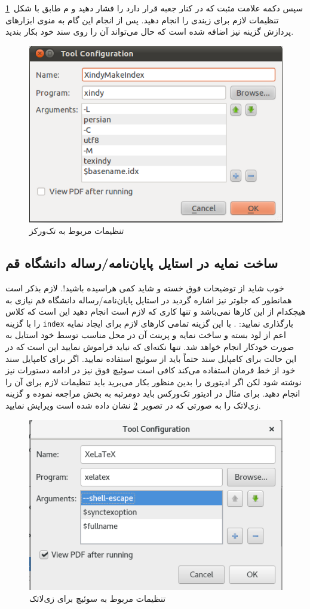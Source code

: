 {{{    سپس دکمه علامت مثبت که در کنار جعبه   قرار دارد را فشار دهید و م
    طابق با شکل~\ref{fig:texworks_xindy}
    تنظیمات لازم برای زیندی را انجام دهید. پس از انجام این گام به منوی ابزارهای پردازش گزینه  نیز اضافه شده است که حال 
    می‌تواند آن را روی سند خود بکار بندید. 
    \begin{figure}[!h]
    \centering
    \centerline{\includegraphics[width=.5\textwidth]{Xindy_Make_Index.png}}
    \caption{تنظیمات مربوط به تک‌ورکز}
    \label{fig:texworks_xindy}
    \end{figure}

    \subsection{ساخت نمایه در استایل پایان‌نامه/رساله دانشگاه قم}
    خوب شاید از توضیحات فوق خسته و شاید کمی هراسیده باشید!. لازم بذکر است 
    همانطور که جلوتر نیز اشاره گردید در استایل پایان‌نامه/رساله دانشگاه قم نیازی به هیچکدام از این کارها نمی‌باشد و تنها کاری که لازم است انجام دهید این است 
    که کلاس را با گزینه     \Verb+index+     بارگذاری نمایید:
     .
     با این گزینه تمامی کارهای لازم برای ایجاد نمایه اعم از لود بسته و ساخت نمایه و پرینت آن در محل مناسب توسط خود استایل به صورت خودکار انجام خواهد شد. 
     تنها نکته‌ای که نباید فراموش نمایید این است که در این حالت برای کامپایل سند حتماً باید از سوئیچ  استفاده نمایید. 
     اگر برای کامپایل سند خود از خط فرمان استفاده می‌کند کافی است سوئیچ فوق نیز در ادامه دستورات نیز نوشته شود لکن اگر ادیتوری را بدین منظور 
     بکار می‌برید باید تنظیمات لازم برای آن را انجام دهید. برای مثال در ادیتور تک‌ورکس باید دومرتبه به بخش  مراجعه نموده و 
     گزینه زی‌لاتک را به صورتی که در تصویر~\ref{fig:texworks_shellescape} نشان داده شده است ویرایش نمایید. 
     
    \begin{figure}[!h]
    \centering
    \centerline{\includegraphics[width=.5\textwidth]{xindy_shellescape}}
    \caption{ تنظیمات مربوط به سوئیچ   برای زی‌لاتک}
    \label{fig:texworks_shellescape}
    \end{figure}     
    
}}}
